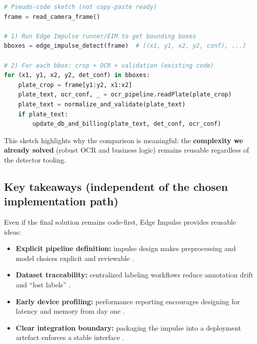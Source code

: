 \begin{lstlisting}[language=Python, caption={Conceptual hybrid integration: Edge Impulse detection output + our OCR pipeline}, label={lst:edge_impulse_hybrid_integration}]
# Pseudo-code sketch (not copy-paste ready)
frame = read_camera_frame()

# 1) Run Edge Impulse runner/EIM to get bounding boxes
bboxes = edge_impulse_detect(frame)  # [(x1, y1, x2, y2, conf), ...]

# 2) For each bbox: crop + OCR + validation (existing code)
for (x1, y1, x2, y2, det_conf) in bboxes:
    plate_crop = frame[y1:y2, x1:x2]
    plate_text, ocr_conf, _ = ocr_pipeline.readPlate(plate_crop)
    plate_text = normalize_and_validate(plate_text)
    if plate_text:
        update_db_and_billing(plate_text, det_conf, ocr_conf)
\end{lstlisting}

\noindent
This sketch highlights why the comparison is meaningful: the \textbf{complexity we already solved} (robust OCR and business logic) remains reusable regardless of the detector tooling.

\subsection{Key takeaways (independent of the chosen implementation path)}
\label{sec:edge_impulse_takeaways}

\noindent
Even if the final solution remains code-first, Edge Impulse provides reusable ideas:
\begin{itemize}
	\item \textbf{Explicit pipeline definition:} impulse design makes preprocessing and model choices explicit and reviewable \cite{EdgeImpulseImpulseDesign}.
	\item \textbf{Dataset traceability:} centralized labeling workflows reduce annotation drift and ``lost labels'' \cite{EdgeImpulseLabelingQueue}.
	\item \textbf{Early device profiling:} performance reporting encourages designing for latency and memory from day one \cite{EdgeImpulseOnDevicePerformance}.
	\item \textbf{Clear integration boundary:} packaging the impulse into a deployment artefact enforces a stable interface \cite{EdgeImpulseLinuxEIM}.
\end{itemize}

